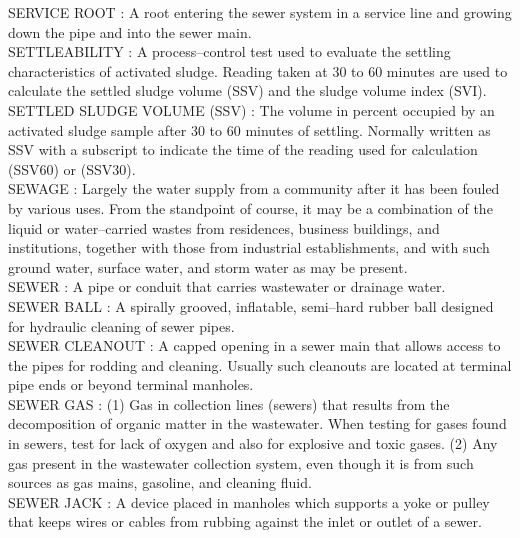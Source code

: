 \vspace{0.15cm}
SERVICE ROOT :  A root entering the sewer system in a service line and growing down the pipe and into the sewer main. \\
\vspace{0.15cm}
SETTLEABILITY :  A process–control test used to evaluate the settling characteristics of activated sludge. Reading taken at 30 to 60 minutes are used to calculate the settled sludge volume (SSV) and the sludge volume index (SVI). \\
\vspace{0.15cm}
SETTLED SLUDGE VOLUME (SSV) :  The volume in percent occupied by an activated sludge sample after 30 to 60 minutes of settling. Normally written as SSV with a subscript to indicate the time of the reading used for calculation (SSV60) or (SSV30). \\
\vspace{0.15cm}
SEWAGE :   Largely the water supply from a community after it has been fouled by various uses. From the standpoint of course, it may be a combination of the liquid or water–carried wastes from residences, business buildings, and institutions, together with those from industrial establishments, and with such ground water, surface water, and storm water as may be present.\\
\vspace{0.15cm}
SEWER :  A pipe or conduit that carries wastewater or drainage water. \\
\vspace{0.15cm}
SEWER BALL :  A spirally grooved, inflatable, semi–hard rubber ball designed for hydraulic cleaning of sewer pipes. \\
\vspace{0.15cm}
SEWER CLEANOUT :  A capped opening in a sewer main that allows access to the pipes for rodding and cleaning. Usually such cleanouts are located at terminal pipe ends or beyond terminal manholes. \\
\vspace{0.15cm}
SEWER GAS :  (1) Gas in collection lines (sewers) that results from the decomposition of organic matter in the wastewater. When testing for gases found in sewers, test for lack of oxygen and also for explosive and toxic gases. (2) Any gas present in the wastewater collection system, even though it is from such sources as gas mains, gasoline, and cleaning fluid. \\
\vspace{0.15cm}
SEWER JACK :  A device placed in manholes which supports a yoke or pulley that keeps wires or cables from rubbing against the inlet or outlet of a sewer. \\
